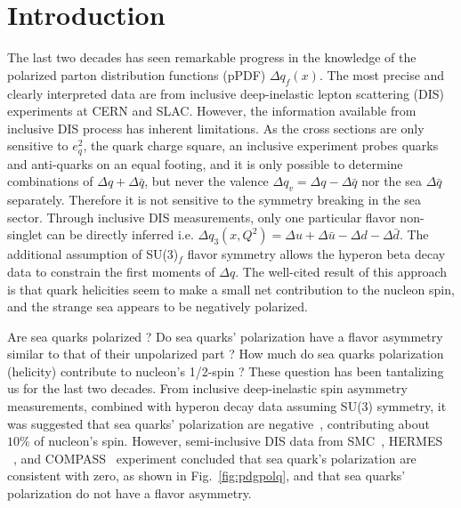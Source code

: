 
\section{Introduction}
\label{sec:introduction}
The last two decades has seen remarkable progress in the knowledge 
of the polarized parton distribution functions (pPDF)
  $\Delta q_f(x)$.
The most precise and clearly interpreted data are from inclusive deep-inelastic
 lepton scattering (DIS)
experiments at CERN and SLAC. 
However, the information available from inclusive DIS process has inherent 
limitations.  As the cross 
sections are only sensitive to $e_q^2$, the quark charge square,
an inclusive experiment probes quarks and anti-quarks on an equal footing, and
 it is only possible to determine combinations of $\Delta q + \Delta \bar{q}$, 
but never the valence $\Delta q_v=\Delta q - \Delta \bar{q}$ nor the sea $\Delta \bar{q}$ separately.    
 Therefore it is not sensitive to the symmetry breaking in the sea sector. 
Through inclusive DIS measurements, only one particular flavor non-singlet can be directly 
inferred  i.e.  $\Delta q_{3}(x,Q^2)=\Delta u+\Delta \bar{u}-\Delta d-\Delta \bar{d}$. 
The additional assumption of SU(3)$_f$ flavor symmetry allows the hyperon beta decay data
to constrain the first moments of $\Delta q$.
The well-cited result of this approach is
that quark helicities seem to make a small net contribution to the nucleon spin, and the
strange sea appears to be negatively polarized.

Are sea quarks polarized ?  Do sea quarks' polarization have a flavor asymmetry similar to that of  their unpolarized part ?  
  How much do sea quarks polarization  (helicity) contribute to nucleon's 1/2-spin ? 
These question has been tantalizing us for the last  two decades.   From inclusive deep-inelastic spin asymmetry measurements, combined with hyperon decay data assuming  SU(3) symmetry, it was suggested that sea quarks' polarization are negative~\cite{Blumlein:2010rn},  contributing about $10\%$ of nucleon's spin.  
 However,  semi-inclusive DIS data from SMC~\cite{Adeva:1997qz}, HERMES ~\cite{Airapetian:2004zf}, and COMPASS~\cite{Alekseev:2010ub} experiment concluded that sea quark's polarization are consistent with zero,  as shown in Fig.~\ref{fig:pdgpolq},  and that sea quarks' polarization do not have a flavor asymmetry.

